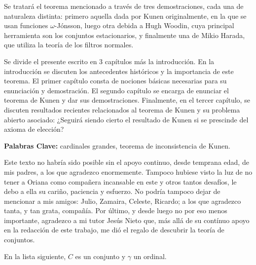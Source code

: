 \documentclass
[
  12pt,
  letterpaper,
  openany,
  oneside,
]{book}
\begin{document}
Se tratará el teorema mencionado a través de tres demostraciones, cada una de naturaleza
distinta: primero aquella dada por Kunen originalmente, en la que se usan funciones $\omega$-Jónsson,
luego otra debida a Hugh Woodin, cuya principal herramienta son los conjuntos estacionarios,
y finalmente una de Mikio Harada, que utiliza la teoría de los filtros normales.

Se divide el presente escrito en 3 capítulos más la introducción.
En la introducción se discuten los antecedentes históricos y la importancia
de este teorema.
El primer capítulo consta de nociones básicas necesarias para su enunciación y demostración.
El segundo capítulo se encarga de enunciar el teorema de Kunen y dar sus demostraciones.
Finalmente, en el tercer capítulo, se discuten resultados recientes relacionados al teorema de Kunen
y su problema abierto asociado:
¿Seguirá siendo cierto el resultado de Kunen si se prescinde del axioma de elección?

\vspace{\fill}

\textbf{Palabras Clave:} cardinales grandes, teorema de inconsistencia de Kunen.
\fi
\ifagradecimientos\newpage
{}

Este texto no habría sido posible sin el apoyo continuo,
desde temprana edad, de mis padres, a los que agradezco enormemente.
Tampoco hubiese visto la luz de no tener a Oriana como
compañera incansable en este y otros tantos desafíos, le debo a ella
su cariño, paciencia y esfuerzo.
No podría tampoco dejar de mencionar a mis amigos: Julio, Zamaira,
Celeste, Ricardo; a los que agradezco tanta, y tan grata, compañía.
Por último, y desde luego no por eso menos importante, agradezco a mi
tutor Jesús Nieto que, más allá de su contínuo apoyo en la redacción
de este trabajo, me dió el regalo de descubrir la teoría de conjuntos.
\fi
\iftoc \ToC \fi
\iflistas
{}

En la lista siguiente, $C$ es un conjunto y $\gamma$ un ordinal.
\end{document}
